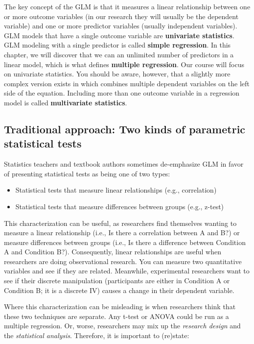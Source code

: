 \documentclass[
]{book}
\begin{document}
The key concept of the GLM is that it measures a linear relationship between one or more outcome variables (in our research they will usually be the dependent variable) and one or more predictor variables (usually independent variables). GLM models that have a single outcome variable are \textbf{univariate statistics}. GLM modeling with a single predictor is called \textbf{simple regression}. In this chapter, we will discover that we can an unlimited number of predictors in a linear model, which is what defines \textbf{multiple regression}. Our course will focus on univariate statistics. You should be aware, however, that a slightly more complex version exists in which combines multiple dependent variables on the left side of the equation. Including more than one outcome variable in a regression model is called \textbf{multivariate statistics}.

\hypertarget{traditional-approach-two-kinds-of-parametric-statistical-tests}{%
\subsection{Traditional approach: Two kinds of parametric statistical tests}\label{traditional-approach-two-kinds-of-parametric-statistical-tests}}

Statistics teachers and textbook authors sometimes de-emphasize GLM in favor of presenting statistical tests as being one of two types:

\begin{itemize}
\item
  Statistical tests that measure linear relationships (e.g., correlation)
\item
  Statistical tests that measure differences between groups (e.g., z-test)
\end{itemize}

This characterization can be useful, as researchers find themselves wanting to measure a linear relationship (i.e., Is there a correlation between A and B?) or measure differences between groups (i.e., Is there a difference between Condition A and Condition B?). Consequently, linear relationships are useful when researchers are doing observational research. You can measure two quantitative variables and see if they are related. Meanwhile, experimental researchers want to see if their discrete manipulation (participants are either in Condition A or Condition B; it is a discrete IV) causes a change in their dependent variable.

Where this characterization can be misleading is when researchers think that these two techniques are separate. Any t-test or ANOVA could be run as a multiple regression. Or, worse, researchers may mix up the \emph{research design} and the \emph{statistical analysis}. Therefore, it is important to (re)state:
\end{document}

